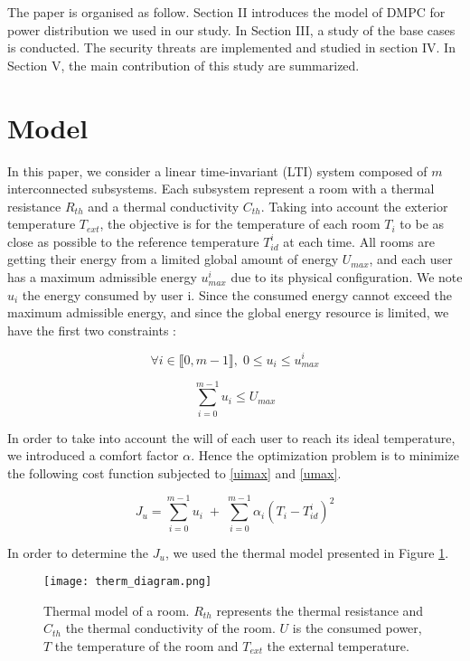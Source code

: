 \documentclass[conference, peerreview]{IEEEtran}
\begin{document}
The paper is organised as follow.  Section II introduces the model of DMPC for power distribution  we used in our study. In Section III,  a study of the base cases is conducted. The security threats are implemented and studied in section IV. In Section V, the main contribution of this study are summarized. 


\section{Model}
In this paper, we consider a linear time-invariant (LTI) system composed of $m$ interconnected subsystems. Each subsystem represent a room with a thermal resistance $R_{th}$ and a thermal conductivity $C_{th}$. Taking into account the exterior temperature $T_{ext}$, the objective is for the temperature of each room $T_i$ to be as close as possible to the reference temperature $T_{id}^i$ at each time. All rooms are getting their energy from a limited global amount of energy $U_{max}$, and each user has a maximum  admissible energy $u_{max}^i$ due to its physical configuration. We note $u_i$ the energy consumed by user i. Since the consumed energy cannot exceed the maximum admissible energy, and since the global energy resource is limited, we have the first two constraints :

\begin{equation}
\forall i \in \llbracket 0, m-1 \rrbracket, \; 0 \leq  u_i \leq  u_{max}^i 
\label{uimax}
\end{equation}

\begin{equation}
\sum_{i = 0}^{m-1} u_i \leq U_{max}
\label{umax}
\end{equation}

In order to take into account the will of each user to reach its ideal temperature, we introduced a comfort factor $\alpha$.  Hence the optimization problem is to minimize the following cost function subjected to \ref{uimax} and \ref{umax}. 

\begin{equation}
J_u = \sum_{i = 0}^{m-1} u_i  \; + \; \sum_{i = 0}^{m-1} \alpha_i (T_i - T_{id}^i)^2 
\label{cost}
\end{equation}

In order to determine the $J_u$, we used the thermal model presented in Figure \ref{thermmod}.

\begin{figure}[!t]
\centering
\texttt{[image: therm\_diagram.png]}
\caption{Thermal model of a room. $R_{th}$ represents the thermal resistance and $C_{th}$ the thermal conductivity of the room. $U$ is the consumed power, $T$ the temperature of the room and $T_{ext}$ the external temperature.}
\label{thermmod}
\end{figure}
\end{document}
